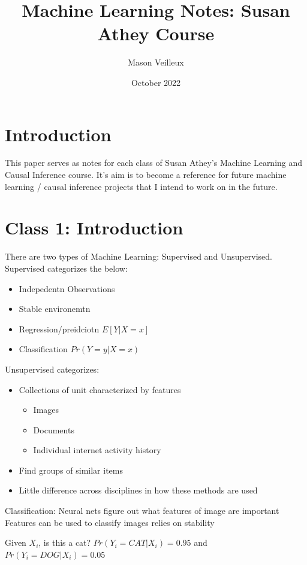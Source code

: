 \documentclass{article}
\title{Machine Learning Notes: Susan Athey Course }
\author{Mason Veilleux}
\date{October 2022}
\begin{document}
\maketitle

\section{Introduction}

This paper serves as notes for each class of Susan Athey's Machine Learning and Causal Inference course. It's aim is to become a reference for future machine learning / causal inference projects that I intend to work on in the future.

\section{Class 1: Introduction}

There are two types of Machine Learning: Supervised and Unsupervised. Supervised categorizes the below:

\begin{itemize}
    \item Indepedentn Observations
    \item Stable environemtn
    \item Regression/preidciotn $E[Y | X = x]$
    \item Classification $Pr(Y=y | X = x)$
\end{itemize}

Unsupervised categorizes:

\begin{itemize}
    \item Collections of unit characterized by features
    \begin{itemize}
        \item Images
        \item Documents
        \item Individual internet activity history
    \end{itemize}
    \item Find groups of similar items
    \item Little difference across disciplines in how these methods are used
\end{itemize}

Classification: Neural nets figure out what features of image are important
Features can be used to classify images
relies on stability

Given $X_i$, is this a cat? $Pr(Y_i = CAT | X_i) = 0.95$ and $Pr(Y_i = DOG | X_i) = 0.05$
\end{document}
